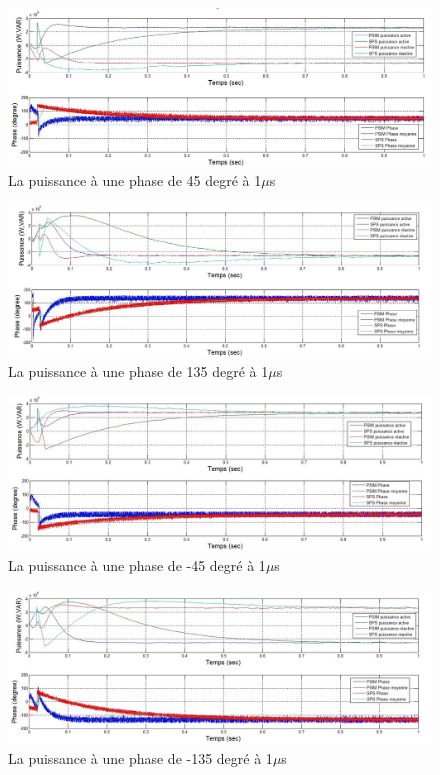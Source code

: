 \documentclass[11pt,letterpaper,final]{report}
\begin{document}
\begin{figure}[htb]
\centering
\includegraphics[scale=0.5]{Fig/AFEIDEAL/pui45.jpg}
\caption{La puissance à une phase de 45 degré à 1$\mu$s}
\label{AF_I_pui_45}
\end{figure}

\begin{figure}[htb]
\centering
\includegraphics[scale=0.5]{Fig/AFEIDEAL/pui135.jpg}
\caption{La puissance à une phase de 135 degré à 1$\mu$s}
\label{AF_I_pui_135}
\end{figure}

\begin{figure}[htb]
\centering
\includegraphics[scale=0.5]{Fig/AFEIDEAL/pui_45.jpg}
\caption{La puissance à une phase de -45 degré à 1$\mu$s}
\label{AF_I_pui__45}
\end{figure}

\begin{figure}[htb]
\centering
\includegraphics[scale=0.5]{Fig/AFEIDEAL/pui_135.jpg}
\caption{La puissance à une phase de -135 degré à 1$\mu$s}
\label{AF_I_pui__135}
\end{figure}
\end{document}
